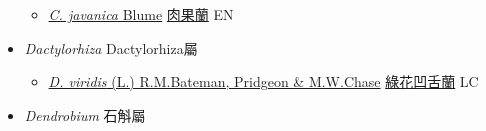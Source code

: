 \begin{itemize}
  \begin{itemize}
        \item[] \href{http://www.theplantlist.org/tpl1.1/search?q=Cyrtosia+javanica}{\textit{C. javanica} Blume}   \href{\detokenize{http://taibnet.sinica.edu.tw/chi/taibnet_species_list.php?T2=肉果蘭&T2_new_value=true&fr=y}}{肉果蘭} EN
  \end{itemize}
 \item[] \textit{Dactylorhiza} Dactylorhiza屬
                    
  \begin{itemize}
        \item[] \href{http://www.theplantlist.org/tpl1.1/search?q=Dactylorhiza+viridis}{\textit{D. viridis} (L.) R.M.Bateman, Pridgeon \& M.W.Chase}     \href{\detokenize{http://taibnet.sinica.edu.tw/chi/taibnet_species_list.php?T2=綠花凹舌蘭&T2_new_value=true&fr=y}}{綠花凹舌蘭} LC
  \end{itemize}
 \item[] \textit{Dendrobium} 石斛屬
                    

\end{itemize}
